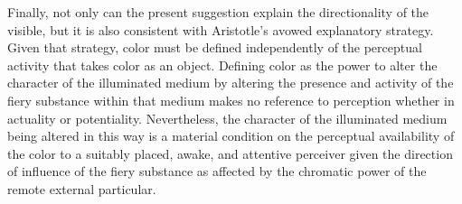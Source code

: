 Finally, not only can the present suggestion explain the directionality of the visible, but it is also consistent with Aristotle's avowed explanatory strategy. Given that strategy, color must be defined independently of the perceptual activity that takes color as an object. Defining color as the power to alter the character of the illuminated medium by altering the presence and activity of the fiery substance within that medium makes no reference to perception whether in actuality or potentiality. Nevertheless, the character of the illuminated medium being altered in this way is a material condition on the perceptual availability of the color to a suitably placed, awake, and attentive perceiver given the direction of influence of the fiery substance as affected by the chromatic power of the remote external particular.

